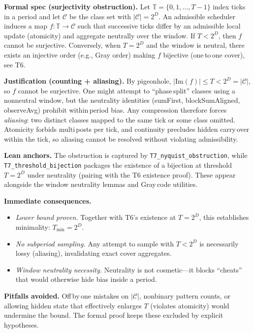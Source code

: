 \documentclass[11pt]{article}
\begin{document}
\medskip
\textbf{Formal spec (surjectivity obstruction).} Let $\mathbb T=\{0,1,\dots,T{-}1\}$ index ticks in a period and let $\mathcal C$ be the class set with $|\mathcal C|=2^D$. An admissible scheduler induces a map $f: \mathbb T\to \mathcal C$ such that successive ticks differ by an admissible local update (atomicity) and aggregate neutrally over the window. If $T<2^D$, then $f$ cannot be surjective. Conversely, when $T=2^D$ and the window is neutral, there exists an injective order (e.g., Gray order) making $f$ bijective (one\,to\,one cover), see T6.

\textbf{Justification (counting + aliasing).} By pigeonhole, $|\mathrm{Im}(f)|\le T<2^D=|\mathcal C|$, so $f$ cannot be surjective. One might attempt to “phase\,split” classes using a nonneutral window, but the neutrality identities (sumFirst, blockSumAligned, observeAvg) prohibit within\,period bias. Any compression therefore forces \emph{aliasing}: two distinct classes mapped to the same tick or some class omitted. Atomicity forbids multi\,posts per tick, and continuity precludes hidden carry\,over within the tick, so aliasing cannot be resolved without violating admissibility.

\textbf{Lean anchors.} The obstruction is captured by \texttt{T7\_nyquist\_obstruction}, while \texttt{T7\_threshold\_bijection} packages the existence of a bijection at threshold $T=2^D$ under neutrality (pairing with the T6 existence proof). These appear alongside the window neutrality lemmas and Gray\,code utilities.

\textbf{Immediate consequences.}
\begin{itemize}[leftmargin=*]
  \item \emph{Lower bound proven.} Together with T6’s existence at $T=2^D$, this establishes minimality: $T_{\min}=2^D$.
  \item \emph{No subperiod sampling.} Any attempt to sample with $T<2^D$ is necessarily lossy (aliasing), invalidating exact cover aggregates.
  \item \emph{Window neutrality necessity.} Neutrality is not cosmetic—it blocks “cheats” that would otherwise hide bias inside a period.
\end{itemize}

\textbf{Pitfalls avoided.} Off\,by\,one mistakes on $|\mathcal C|$, nonbinary pattern counts, or allowing hidden state that effectively enlarges $T$ (violates atomicity) would undermine the bound. The formal proof keeps these excluded by explicit hypotheses.
\end{document}
